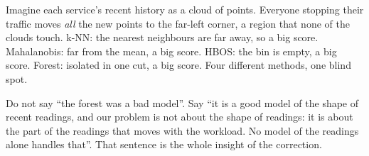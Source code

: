\begin{examplebox}
Imagine each service's recent history as a cloud of points. Everyone stopping their traffic moves \emph{all} the new points to the far-left corner, a region that none of the clouds touch. k-NN: the nearest neighbours are far away, so a big score. Mahalanobis: far from the mean, a big score. HBOS: the bin is empty, a big score. Forest: isolated in one cut, a big score. Four different methods, one blind spot.
\end{examplebox}

\begin{warnbox}
Do not say ``the forest was a bad model''. Say ``it is a good model of the shape of recent readings, and our problem is not about the shape of readings: it is about the part of the readings that moves with the workload. No model of the readings alone handles that''. That sentence is the whole insight of the correction.
\end{warnbox}

